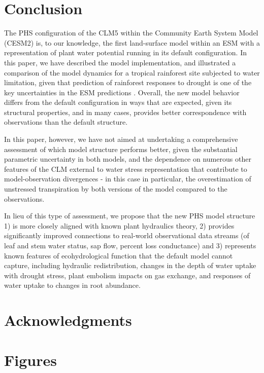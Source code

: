 \documentclass[draft,linenumbers]{agujournal}
\begin{document}
\section{Conclusion}

    The PHS configuration of the CLM5 within the Community Earth System Model (CESM2) is, to our knowledge, the first land-surface model within an ESM with a representation of plant water potential running in its default configuration. In this paper, we have described the model implementation, and illustrated a comparison of the model dynamics for a tropical rainforest site subjected to water limitation, given that prediction of rainforest responses to drought is one of the key uncertainties in the ESM predictions \citep{huntingford2013}. Overall, the new model behavior differs from the default configuration in ways that are expected, given its structural properties, and in many cases, provides better correspondence with observations than the default structure. 
    
    In this paper, however, we have not aimed at undertaking a comprehensive assessment of which model structure performs better, given the substantial parametric uncertainty in both models, and the dependence on numerous other features of the CLM external to water stress representation that contribute to model-observation divergences - in this case in particular, the overestimation of unstressed transpiration by both versions of the model compared to the observations. 
    
    In lieu of this type of assessment, we propose that the new PHS model structure 1) is more closely aligned with known plant hydraulics theory, 2) provides significantly improved connections to real-world observational data streams (of leaf and stem water status, sap flow, percent loss conductance) and 3) represents known features of ecohydrological function that the default model cannot capture, including hydraulic redistribution, changes in the depth of water uptake with drought stress, plant embolism impacts on gas exchange, and responses of water uptake to changes in root abundance. 
      
\section{Acknowledgments}

\clearpage    

\section{Figures}
\end{document}
